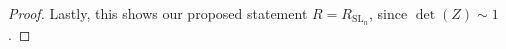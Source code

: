 \begin{proof}
  Lastly, this shows our proposed statement $ R = R_{\operatorname{SL}_n} $, since $ \operatorname{det} (Z) \sim 1 $.
\end{proof}

